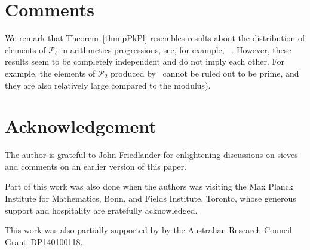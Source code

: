 \documentclass[12pt]{amsart}
\begin{document}
\section{Comments}

We remark that Theorem~\ref{thm:pPkPl} resembles results about 
the distribution of elements of ${{\mathcal P}}_\ell$ in arithmetics 
progressions, see, for example, ~\cite[Theorem~25.8]{FrIw}. However, 
these results seem to be 
 completely independent and do not imply each other. 
 For example, the elements of ${{\mathcal P}}_2$ produced by~\cite[Theorem~25.8]{FrIw}
 cannot be ruled out to be prime, and they are also relatively large compared 
 to the modulus). 
 
 

\section*{Acknowledgement}

The author is grateful to John Friedlander for enlightening 
discussions on sieves and comments on an earlier version of this paper.   

Part of this work was also done when
the authors was visiting 
the Max Planck Institute for Mathematics, Bonn, and Fields Institute, Toronto, 
whose  generous 
support and hospitality are gratefully acknowledged. 

This work was also partially supported  by  
by the Australian Research Council Grant~DP140100118. 
\end{document}

